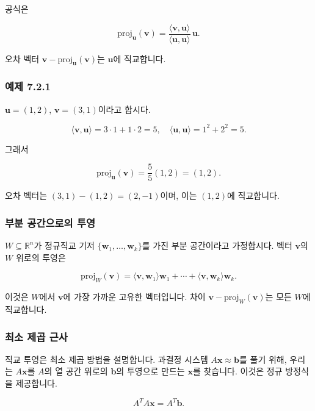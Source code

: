 \documentclass[
  12pt,
  a4paper,
]{article}
\begin{document}
공식은

\[\text{proj}_{\mathbf{u}}(\mathbf{v}) = \frac{\langle \mathbf{v}, \mathbf{u} \rangle}{\langle \mathbf{u}, \mathbf{u} \rangle} \, \mathbf{u}.\]

오차 벡터 \(\mathbf{v} - \text{proj}_{\mathbf{u}}(\mathbf{v})\)는 \(\mathbf{u}\)에 직교합니다.

\subsubsection{예제 7.2.1}\label{example-721}

\(\mathbf{u} = (1,2)\), \(\mathbf{v} = (3,1)\)이라고 합시다.

\[\langle \mathbf{v}, \mathbf{u} \rangle = 3\cdot 1 + 1\cdot 2 = 5, \quad
\langle \mathbf{u}, \mathbf{u} \rangle = 1^2 + 2^2 = 5.\]

그래서

\[\text{proj}_{\mathbf{u}}(\mathbf{v}) = \frac{5}{5}(1,2) = (1,2).\]

오차 벡터는 \((3,1) - (1,2) = (2,-1)\)이며, 이는 \((1,2)\)에 직교합니다.

\subsubsection{부분 공간으로의 투영}\label{projection-onto-a-subspace}

\(W \subseteq \mathbb{R}^n\)가 정규직교 기저 \(\{ \mathbf{w}_1, \dots, \mathbf{w}_k \}\)를 가진 부분 공간이라고 가정합시다. 벡터 \(\mathbf{v}\)의 \(W\) 위로의 투영은

\[\text{proj}_{W}(\mathbf{v}) = \langle \mathbf{v}, \mathbf{w}_1 \rangle \mathbf{w}_1 + \cdots + \langle \mathbf{v}, \mathbf{w}_k \rangle \mathbf{w}_k.\]

이것은 \(W\)에서 \(\mathbf{v}\)에 가장 가까운 고유한 벡터입니다. 차이 \(\mathbf{v} - \text{proj}_{W}(\mathbf{v})\)는 모든 \(W\)에 직교합니다.

\subsubsection{최소 제곱 근사}\label{least-squares-approximation}

직교 투영은 최소 제곱 방법을 설명합니다. 과결정 시스템 \(A\mathbf{x} \approx \mathbf{b}\)를 풀기 위해, 우리는 \(A\mathbf{x}\)를 \(A\)의 열 공간 위로의 \(\mathbf{b}\)의 투영으로 만드는 \(\mathbf{x}\)를 찾습니다. 이것은 정규 방정식을 제공합니다.

\[A^T A \mathbf{x} = A^T \mathbf{b}.\]
\end{document}
